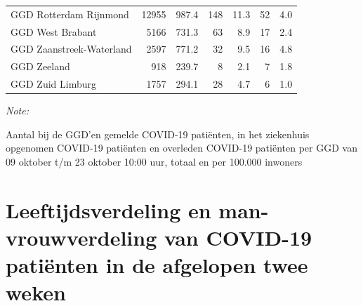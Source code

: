\documentclass[
  english,
  man,floatsintext]{apa6}
\begin{document}
\begin{table}[H]
\begin{threeparttable}
\begin{tabular}{lrrrrrr}
GGD Rotterdam Rijnmond & 12955 & 987.4 & 148 & 11.3 & 52 & 4.0\\
GGD West Brabant & 5166 & 731.3 & 63 & 8.9 & 17 & 2.4\\
GGD Zaanstreek-Waterland & 2597 & 771.2 & 32 & 9.5 & 16 & 4.8\\
GGD Zeeland & 918 & 239.7 & 8 & 2.1 & 7 & 1.8\\
GGD Zuid Limburg & 1757 & 294.1 & 28 & 4.7 & 6 & 1.0\\
\bottomrule
\end{tabular}
\begin{tablenotes}
\item \textit{Note: } 
\item Aantal bij de GGD’en gemelde COVID-19 patiënten, in het ziekenhuis opgenomen COVID-19 patiënten en overleden COVID-19 patiënten per GGD van 09 oktober t/m 23 oktober 10:00 uur, totaal en per 100.000 inwoners
\end{tablenotes}
\end{threeparttable}
\endgroup{}
\end{table}

\newpage

\hypertarget{leeftijdsverdeling-en-man-vrouwverdeling-van-covid-19-patiuxebnten-in-de-afgelopen-twee-weken}{%
\section{Leeftijdsverdeling en man-vrouwverdeling van COVID-19 patiënten in de afgelopen twee weken}\label{leeftijdsverdeling-en-man-vrouwverdeling-van-covid-19-patiuxebnten-in-de-afgelopen-twee-weken}}
\end{document}

